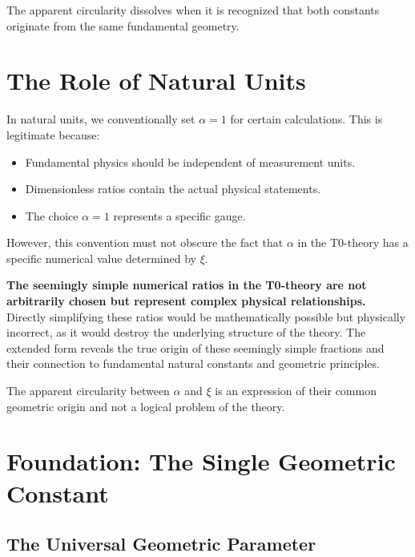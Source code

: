 	The apparent circularity dissolves when it is recognized that both constants originate from the same fundamental geometry.
	
	\section{The Role of Natural Units}
	\label{sec:units}
	
	In natural units, we conventionally set \(\alpha = 1\) for certain calculations. This is legitimate because:
	
	\begin{itemize}
		\item Fundamental physics should be independent of measurement units.
		\item Dimensionless ratios contain the actual physical statements.
		\item The choice \(\alpha = 1\) represents a specific gauge.
	\end{itemize}
	
	However, this convention must not obscure the fact that \(\alpha\) in the T0-theory has a specific numerical value determined by \(\xi\).
	
	\begin{tcolorbox}[colback=blue!5!white,colframe=blue!75!black]
		\textbf{The seemingly simple numerical ratios in the T0-theory are not arbitrarily chosen but represent complex physical relationships.} \\
		
		Directly simplifying these ratios would be mathematically possible but physically incorrect, as it would destroy the underlying structure of the theory. The extended form reveals the true origin of these seemingly simple fractions and their connection to fundamental natural constants and geometric principles.
		
		The apparent circularity between \(\alpha\) and \(\xi\) is an expression of their common geometric origin and not a logical problem of the theory.
	\end{tcolorbox}

	\section{Foundation: The Single Geometric Constant}
	
	\subsection{The Universal Geometric Parameter}
	
